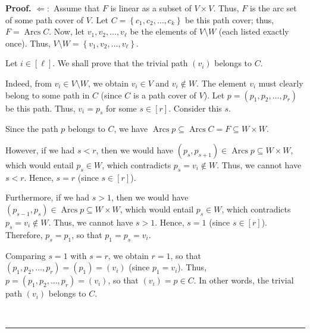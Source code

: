 \documentclass[numbers=enddot,12pt,final,onecolumn,notitlepage]{scrartcl}%
\numberwithin{exer}{section}
\theoremstyle{definition}
\newenvironment{proof}[1][Proof]{\noindent\textbf{#1.} }{\ \rule{0.5em}{0.5em}}
\newenvironment{verlong}{}{}
\begin{document}
\begin{verlong}
\begin{proof}
$\Longleftarrow:$ Assume that $F$ is linear as a subset of $V\times V$. Thus,
$F$ is the arc set of some path cover of $V$. Let $C=\left\{  c_{1}%
,c_{2},\ldots,c_{k}\right\}  $ be this path cover; thus,
$F=\operatorname*{Arcs}C$. Now, let $v_{1},v_{2},\ldots,v_{\ell}$ be the
elements of $V\setminus W$ (each listed exactly once). Thus, $V\setminus
W=\left\{  v_{1},v_{2},\ldots,v_{\ell}\right\}  $.

Let $i\in\left[  \ell\right]  $. We shall prove that the trivial path $\left(
v_{i}\right)  $ belongs to $C$.

Indeed, from $v_{i}\in V\setminus W$, we obtain $v_{i}\in V$ and $v_{i}\notin
W$. The element $v_{i}$ must clearly belong to some path in $C$ (since $C$ is
a path cover of $V$). Let $p=\left(  p_{1},p_{2},\ldots,p_{r}\right)  $ be
this path. Thus, $v_{i}=p_{s}$ for some $s\in\left[  r\right]  $. Consider
this $s$.

Since the path $p$ belongs to $C$, we have $\operatorname*{Arcs}%
p\subseteq\operatorname*{Arcs}C=F\subseteq W\times W$.

However, if we had $s<r$, then we would have $\left(  p_{s},p_{s+1}\right)
\in\operatorname*{Arcs}p\subseteq W\times W$, which would entail $p_{s}\in W$,
which contradicts $p_{s}=v_{i}\notin W$. Thus, we cannot have $s<r$. Hence,
$s=r$ (since $s\in\left[  r\right]  $).

Furthermore, if we had $s>1$, then we would have $\left(  p_{s-1}%
,p_{s}\right)  \in\operatorname*{Arcs}p\subseteq W\times W$, which would
entail $p_{s}\in W$, which contradicts $p_{s}=v_{i}\notin W$. Thus, we cannot
have $s>1$. Hence, $s=1$ (since $s\in\left[  r\right]  $). Therefore,
$p_{s}=p_{1}$, so that $p_{1}=p_{s}=v_{i}$.

Comparing $s=1$ with $s=r$, we obtain $r=1$, so that $\left(  p_{1}%
,p_{2},\ldots,p_{r}\right)  =\left(  p_{1}\right)  =\left(  v_{i}\right)  $
(since $p_{1}=v_{i}$). Thus, $p=\left(  p_{1},p_{2},\ldots,p_{r}\right)
=\left(  v_{i}\right)  $, so that $\left(  v_{i}\right)  =p\in C$. In other
words, the trivial path $\left(  v_{i}\right)  $ belongs to $C$.


\end{proof}
\end{verlong}
\end{document}
